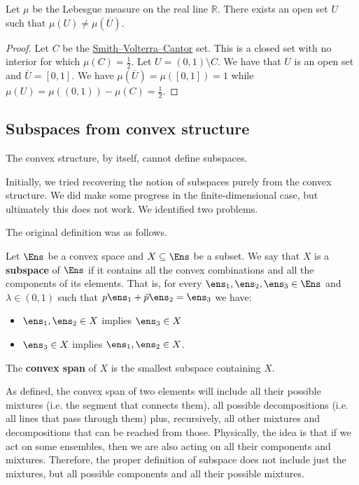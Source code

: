 \begin{prop}
	Let $\mu$ be the Lebesgue measure on the real line $\mathbb{R}$. There exists an open set $U$ such that $\mu(U) \neq \mu(\overline{U})$.
\end{prop}

\begin{proof}
	Let $C$ be the \href{https://en.wikipedia.org/wiki/Smith%E2%80%93Volterra%E2%80%93Cantor_set}{Smith–Volterra–Cantor} set. This is a closed set with no interior for which $\mu(C) = \frac{1}{2}$. Let $U = (0,1) \setminus C$. We have that $U$ is an open set and $\overline{U} = [0,1]$. We have $\mu(\overline{U}) = \mu([0,1]) = 1$ while $\mu(U) = \mu((0,1)) - \mu(C) = \frac{1}{2}$.
\end{proof}

\subsection{Subspaces from convex structure}\label{pm-es-failureConvexSubspace}

\begin{insight}
	The convex structure, by itself, cannot define subspaces.
\end{insight}

Initially, we tried recovering the notion of subspaces purely from the convex structure. We did make some progress in the finite-dimensional case, but ultimately this does not work. We identified two problems.

The original definition was as follows.

\begin{defn}
	Let $\Ens$ be a convex space and $X \subseteq \Ens$ be a subset. We say that $X$ is a \textbf{subspace} of $\Ens$ if it contains all the convex combinations and all the components of its elements. That is, for every $\ens_1, \ens_2, \ens_3 \in \Ens$ and $\lambda \in (0,1)$ such that $p \ens_1 + \bar{p} \ens_2 = \ens_3$ we have:
	\begin{itemize}
		\item $\ens_1, \ens_2 \in X$ implies $\ens_3 \in X$
		\item $\ens_3 \in X$ implies $\ens_1, \ens_2 \in X$.
	\end{itemize}
	The \textbf{convex span} of $X$ is the smallest subspace containing $X$.
\end{defn}

\begin{remark}
	As defined, the convex span of two elements will include all their possible mixtures (i.e. the segment that connects them), all possible decompositions (i.e. all lines that pass through them) plus, recursively, all other mixtures and decompositions that can be reached from those. Physically, the idea is that if we act on some ensembles, then we are also acting on all their components and mixtures. Therefore, the proper definition of subspace does not include just the mixtures, but all possible components and all their possible mixtures.
\end{remark}

